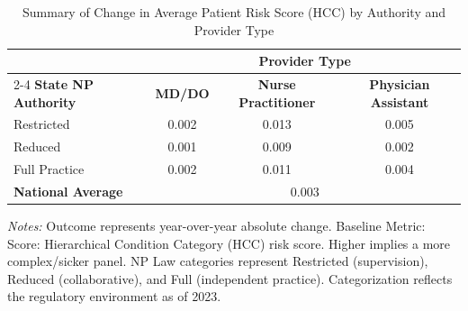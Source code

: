 \begin{table}[htbp]
    \centering
    \caption{Summary of Change in Average Patient Risk Score (HCC) by Authority and Provider Type}
    \label{tab:d_bene_avg_risk_scre_provtype}
    \vspace{0.2cm}
    \begin{tabular}{lccc}
        \toprule
        & \multicolumn{3}{c}{\textbf{Provider Type}} \\
        \cmidrule(lr){2-4}
        \textbf{State NP Authority} & \textbf{MD/DO} & \textbf{Nurse Practitioner} & \textbf{Physician Assistant} \\
        \midrule
        Restricted & 0.002 & 0.013 & 0.005 \\
        Reduced & 0.001 & 0.009 & 0.002 \\
        Full Practice & 0.002 & 0.011 & 0.004 \\
        \midrule
        \textbf{National Average} & \multicolumn{3}{c}{0.003} \\
        \bottomrule
    \end{tabular}
    \vspace{0.1cm}
    \begin{minipage}{0.85\textwidth}
        \footnotesize \textit{Notes:} Outcome represents year-over-year absolute change. Baseline Metric: Score: Hierarchical Condition Category (HCC) risk score. Higher implies a more complex/sicker panel. NP Law categories represent Restricted (supervision), Reduced (collaborative), and Full (independent practice). Categorization reflects the regulatory environment as of 2023.
    \end{minipage}
\end{table}